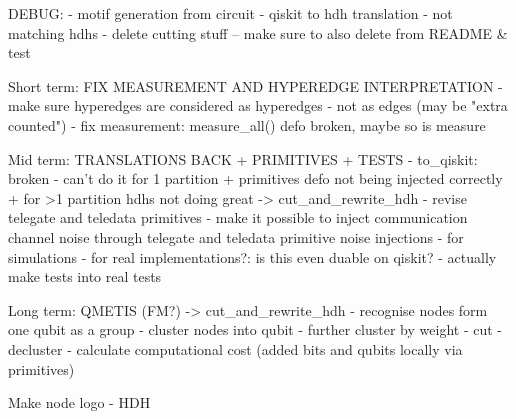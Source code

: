 DEBUG: 
- motif generation from circuit
- qiskit to hdh translation - not matching hdhs
- delete cutting stuff -- make sure to also delete from README & test

Short term: FIX MEASUREMENT AND HYPEREDGE INTERPRETATION
- make sure hyperedges are considered as hyperedges - not as edges (may be "extra counted")
- fix measurement: measure_all() defo broken, maybe so is measure

Mid term: TRANSLATIONS BACK + PRIMITIVES + TESTS 
- to_qiskit: broken - can't do it for 1 partition + primitives defo not being injected correctly + for >1 partition hdhs not doing great
    -> cut_and_rewrite_hdh
- revise telegate and teledata primitives
- make it possible to inject communication channel noise through telegate and teledata primitive noise injections 
    - for simulations
    - for real implementations?: is this even duable on qiskit?
- actually make tests into real tests

Long term: QMETIS (FM?)     -> cut_and_rewrite_hdh
- recognise nodes form one qubit as a group
- cluster nodes into qubit
- further cluster by weight
- cut
- decluster
- calculate computational cost (added bits and qubits locally via primitives)

Make node logo - HDH